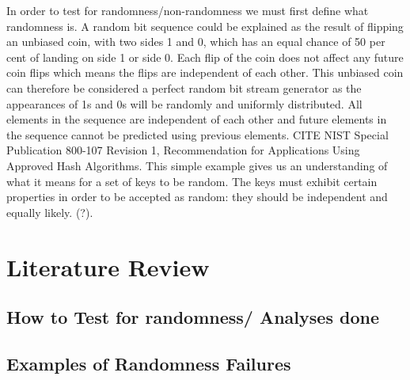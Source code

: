 In order to test for randomness/non-randomness we must first define what randomness is. A random bit sequence could be explained as the result of flipping an unbiased coin, with two sides 1 and 0, which has an equal chance of 50 per cent of landing on side 1 or side 0. Each flip of the coin does not affect any future coin flips which means the flips are independent of each other. This unbiased coin can therefore be considered a perfect random bit stream generator as the appearances of 1s and 0s will be randomly and uniformly distributed. All elements in the sequence are independent of each other and future elements in the sequence cannot be predicted using previous elements. CITE NIST Special Publication 800-107 Revision 1, Recommendation for Applications Using Approved Hash Algorithms. This simple example gives us an understanding of what it means for a set of keys to be random. The keys must exhibit certain properties in order to be accepted as random: they should be independent and equally likely. (?).
\section{Literature Review}
\subsection{How to Test for randomness/ Analyses done}
\subsection{Examples of Randomness Failures}